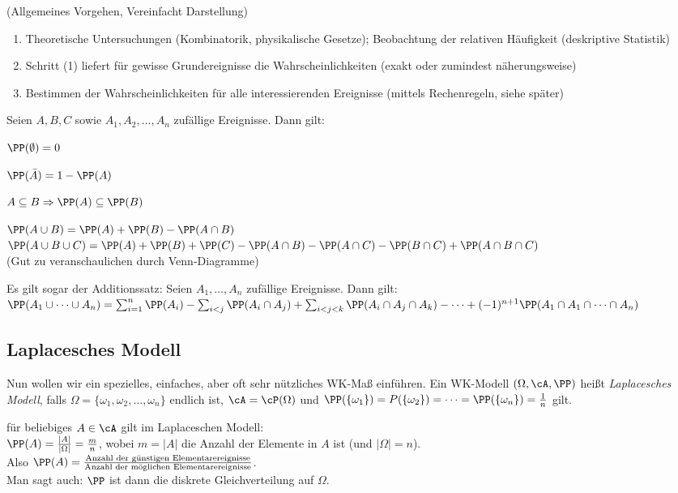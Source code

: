  (Allgemeines Vorgehen, Vereinfacht Darstellung)
\begin{enumerate}
\item Theoretische Untersuchungen (Kombinatorik, physikalische Gesetze); Beobachtung der relativen Häufigkeit (deskriptive Statistik)
\item Schritt (1) liefert für gewisse Grundereignisse die Wahrscheinlichkeiten (exakt oder zumindest näherungsweise)
\item Bestimmen der Wahrscheinlichkeiten für alle interessierenden Ereignisse (mittels Rechenregeln, siehe später)
\end{enumerate}

 Seien $A,B,C$ sowie $A_1, A_2, \dots ,A_n$ zufällige Ereignisse. Dann gilt:
\begin{anumerate}
\item $\PP(\emptyset)=0$
\item $\PP(\bar A) = 1 - \PP (A)$
\item $A \subseteq B \Rightarrow \PP(A) \subseteq \PP (B)$
\item $\PP(A \cup B)=\PP(A)+\PP(B)-\PP(A \cap B)$\\
$\PP ( A \cup B \cup C) = \PP(A) + \PP(B) + \PP(C)-\PP(A \cap B) - \PP(A\cap C) - \PP(B\cap C ) + \PP(A \cap B \cap C)$\\
(Gut zu veranschaulichen durch Venn-Diagramme)
\end{anumerate}
Es gilt sogar der Additionssatz:
 Seien $A_1, \dots, A_n$ zufällige Ereignisse. Dann gilt: \\
$\PP(A_1 \cup \dots \cup A_n)=\sum_{i=1}^n \PP(A_i)-\sum_{i<j} \PP(A_i \cap A_j) + \sum_{i<j<k}\PP(A_i \cap A_j \cap A_k) - \dots + (-1)^{n+1} \PP(A_1\cap A_1 \cap \dots \cap A_n)$

\subsection{Laplacesches Modell}
Nun wollen wir ein spezielles, einfaches, aber oft sehr nützliches WK-Maß einführen.
 Ein WK-Modell $(\Omega, \cA, \PP)$ heißt \emph{Laplacesches Modell}, falls $\Omega = \{\omega_1, \omega_2, \dots , \omega_n\}$ endlich ist, $\cA = \cP ( \Omega)$ und $\PP(\{\omega_1\})=P(\{\omega_2\})=\dots = \PP(\{\omega_n\})=\frac{1}{n}$ gilt.

 für beliebiges $A \in \cA$ gilt im Laplaceschen Modell:\\
$\PP(A) = \frac{|A|}{|\Omega|}=\frac{m}{n}$, wobei $m=|A|$ die Anzahl der Elemente in $A$ ist (und $|\Omega|=n$).\\
Also $\PP(A)=\frac{\text{Anzahl der günstigen Elementarereignisse}}{\text{Anzahl der möglichen Elementarereignisse}}$.\\
Man sagt auch: $\PP$ ist dann die diskrete Gleichverteilung auf $\Omega$.

